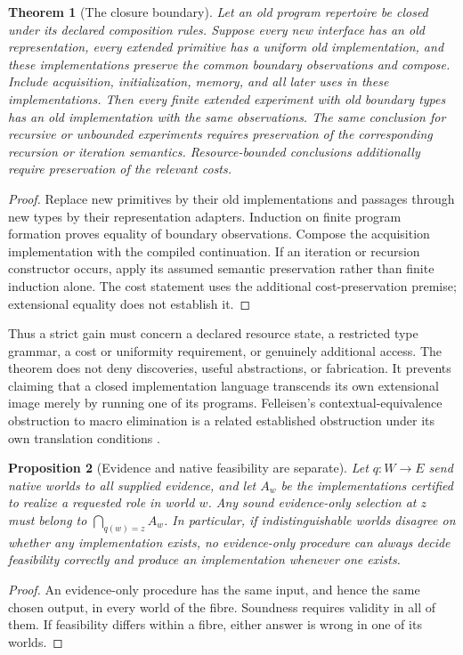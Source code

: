 \documentclass[11pt]{article}
\newtheorem{theorem}{Theorem}[section]
\newtheorem{proposition}[theorem]{Proposition}
\theoremstyle{definition}
\theoremstyle{remark}
\begin{document}
\begin{theorem}[The closure boundary]\label{thm:closure}
Let an old program repertoire be closed under its declared composition rules. Suppose every new interface has an old representation, every extended primitive has a uniform old implementation, and these implementations preserve the common boundary observations and compose. Include acquisition, initialization, memory, and all later uses in these implementations. Then every finite extended experiment with old boundary types has an old implementation with the same observations. The same conclusion for recursive or unbounded experiments requires preservation of the corresponding recursion or iteration semantics. Resource-bounded conclusions additionally require preservation of the relevant costs.
\end{theorem}
\begin{proof}
Replace new primitives by their old implementations and passages through new types by their representation adapters. Induction on finite program formation proves equality of boundary observations. Compose the acquisition implementation with the compiled continuation. If an iteration or recursion constructor occurs, apply its assumed semantic preservation rather than finite induction alone. The cost statement uses the additional cost-preservation premise; extensional equality does not establish it.
\end{proof}

Thus a strict gain must concern a declared resource state, a restricted type grammar, a cost or uniformity requirement, or genuinely additional access. The theorem does not deny discoveries, useful abstractions, or fabrication. It prevents claiming that a closed implementation language transcends its own extensional image merely by running one of its programs. Felleisen's contextual-equivalence obstruction to macro elimination is a related established obstruction under its own translation conditions \cite[Theorem 3.14]{Felleisen1991}.

\begin{proposition}[Evidence and native feasibility are separate]\label{prop:evidence}
Let $q:W\to E$ send native worlds to all supplied evidence, and let $A_w$ be the implementations certified to realize a requested role in world $w$. Any sound evidence-only selection at $z$ must belong to $\bigcap_{q(w)=z}A_w$. In particular, if indistinguishable worlds disagree on whether any implementation exists, no evidence-only procedure can always decide feasibility correctly and produce an implementation whenever one exists.
\end{proposition}
\begin{proof}
An evidence-only procedure has the same input, and hence the same chosen output, in every world of the fibre. Soundness requires validity in all of them. If feasibility differs within a fibre, either answer is wrong in one of its worlds.
\end{proof}
\end{document}
